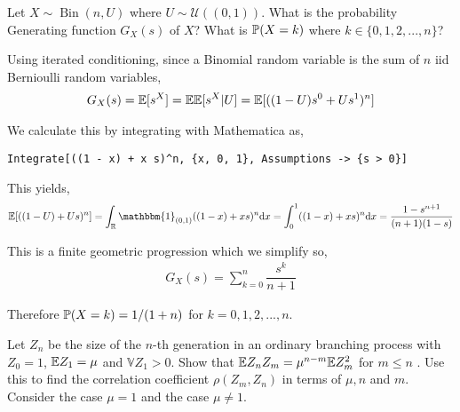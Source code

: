 \documentclass[10pt]{article}
\begin{document}
\maketitle

\begin{problem}[Exercise 3.1]%
    Let \(X \sim \operatorname{Bin}(n,U) \) where \( U\sim \mathcal{U}((0,1))\). What is the probability Generating function \( G_X(s) \) of \( X \)? What is \( \mathbb{P}(X=k) \) where \( k\in\{0,1,2,...,n\} \)?
\end{problem}

\begin{solution}[Solution]
Using iterated conditioning, since a Binomial random variable is the sum of \( n \) iid Bernioulli random variables,
\begin{align*}
    G_X(s) = \mathbb{E}[s^X] = \mathbb{E}\mathbb{E}[s^X|U] = \mathbb{E}[((1-U)s^0+Us^1)^n]
\end{align*}

We calculate this by integrating with Mathematica as,
\begin{lstlisting}
Integrate[((1 - x) + x s)^n, {x, 0, 1}, Assumptions -> {s > 0}] 
\end{lstlisting}

This yields,
\begin{align*}
    \EE[((1-U)+Us)^n] = \int_\RR \mathbbm{1}_{(0,1)}((1-x)+xs)^n \d x 
    = \int_{0}^{1}((1-x)+xs)^n \d x = \dfrac{1-s^{n+1}}{(n+1)(1-s)} \\
\end{align*}

This is a finite geometric progression which we simplify so,
\begin{align*}
    G_X(s) = \sum_{k=0}^{n} \dfrac{s^k}{n+1}
\end{align*}

Therefore \( \mathbb{P}(X=k) = 1/(1+n) \) for \( k=0,1,2,...,n \).
\end{solution}

\begin{problem}[Exercise 3.2]
    Let \( Z_n \) be the size of the \( n \)-th generation in an ordinary branching process with \( Z_0 = 1\), \( \mathbb{E} Z_1=\mu \) and \( \mathbb{V}Z_1>0 \). Show that \( \mathbb{E} Z_nZ_m=\mu^{n-m} \mathbb{E} Z_m^2 \) for \( m\leq n\) . Use this to find the correlation coefficient \( \rho(Z_m,Z_n) \) in terms of \( \mu, n\) and \( m \). Consider the case \( \mu = 1 \) and the case \( \mu \neq 1 \).
\end{problem}
\end{document}
